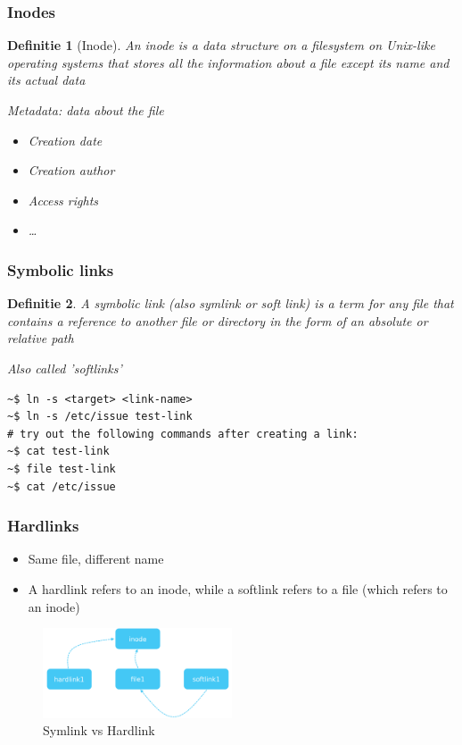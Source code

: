 \documentclass{article}
\newtheorem{theorem}{Definitie}[section]
\begin{document}
\subsubsection{Inodes}

\begin{theorem}[Inode]
    An inode is a data structure on a filesystem on Unix-like operating systems that 
    stores all the information about a file except its name and its actual data

    Metadata: data about the file
    \begin{itemize}
        \item Creation date
        \item Creation author
        \item Access rights
        \item \dots
    \end{itemize}
\end{theorem}

\subsubsection{Symbolic links}

\begin{theorem}
    A symbolic link (also symlink or soft link) is a term for any file that contains a reference to another file or directory in the form of an absolute or relative path

    Also called 'softlinks'
\end{theorem}

\begin{verbatim}
~$ ln -s <target> <link-name>
~$ ln -s /etc/issue test-link
# try out the following commands after creating a link:
~$ cat test-link
~$ file test-link
~$ cat /etc/issue
\end{verbatim}


\subsubsection{Hardlinks}

\begin{itemize}
    \item Same file, different name
    \item A hardlink refers to an inode, while a softlink refers to a file (which refers to an inode)
\end{itemize}

\begin{figure}[H]
    \centering
    \includegraphics[width=0.5\textwidth]{soft-vs-hard-links.png}
    \caption{Symlink vs Hardlink}
\end{figure}
\end{document}
